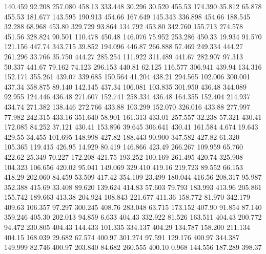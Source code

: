  140.459   92.208  257.080       458.13
 333.448   30.296   30.520       455.53
 174.390   35.812   65.878       455.53
 181.677  143.595  190.913       454.66
 167.649  145.343  336.898       454.66
 188.545   32.288   68.968       453.80
 329.729   93.864  134.792       453.80
 342.760  155.713  274.578       451.56
 328.824   90.501  110.478       450.48
 146.076   75.952  253.286       450.33
  19.934   91.570  121.156       447.74
 343.715   39.852  194.096       446.87
 266.888   57.469  249.334       444.27
 261.296   33.766   35.750       444.27
 285.254  111.922  311.489       441.67
 282.907   97.313   50.337       441.67
  79.162   74.123  296.153       440.81
  62.125  116.577  306.941       439.94
 134.316  152.171  355.261       439.07
 339.685  150.564   41.204       438.21
 294.565  102.006  300.001       437.34
 358.875   89.140  142.145       437.34
 106.081  103.835  301.950       436.48
 344.089   92.955  124.446       436.48
 271.607  152.741  258.334       436.48
 164.355  152.404  214.937       434.74
 271.382  138.446  272.766       433.88
 103.299  152.070  326.016       433.88
 277.997   77.982  242.315       433.16
 351.640   58.901  161.313       433.01
 257.557   32.238   57.321       430.41
 172.085   84.252   37.121       430.41
 153.896   39.645  306.641       430.41
 161.584    4.674   19.643       429.55
  34.455  101.695  148.998       427.82
 188.443   90.900  347.582       427.82
  61.320  105.365  119.415       426.95
  14.929   80.419  146.866       423.49
 266.267  109.959   65.760       422.62
  25.349   70.227  172.208       421.75
 193.252  100.169  261.495       420.74
 325.908  104.323  106.656       420.02
  95.041  149.069  329.410       419.16
 219.723   89.552   66.153       418.29
 202.060   84.459   53.509       417.42
 354.109   23.499  180.044       416.56
 208.317   95.987  352.388       415.69
  33.408   89.620  139.624       414.83
  57.603   79.793  183.993       413.96
 205.861  155.742  189.663       413.38
 204.924  108.843  221.677       411.36
 158.772   81.970  342.179       409.63
 106.357   97.297  300.245       408.76
 283.048   63.715  173.152       407.90
  91.854   87.140  359.246       405.30
 202.013   94.859    6.633       404.43
 332.922   81.526  163.511       404.43
 200.772   94.472  230.805       404.43
 144.433  101.335  334.137       404.29
 134.787  158.200  211.134       404.15
 168.039   29.682   67.574       400.97
 301.274   97.591  129.176       400.97
 344.387  149.999   82.746       400.97
 203.840   84.682  260.555       400.10
   0.968  144.556  187.289       398.37
